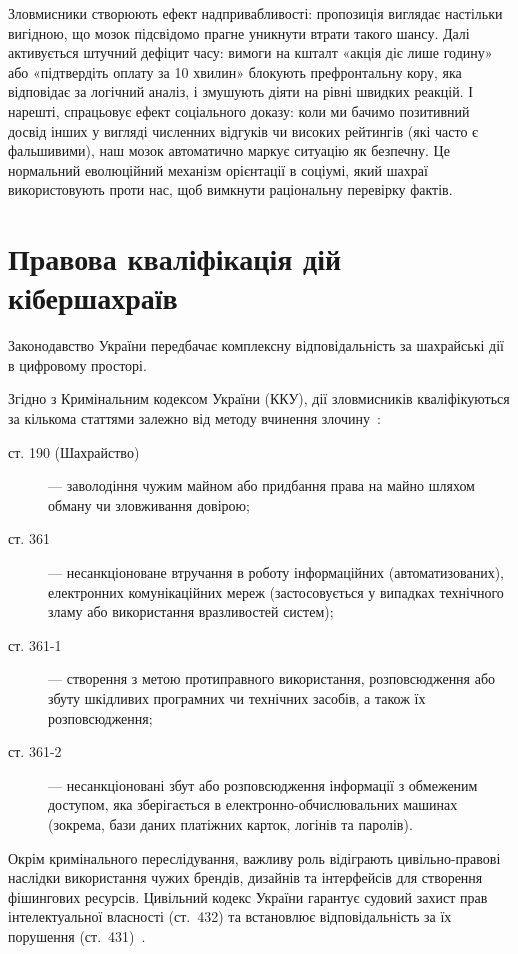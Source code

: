 Зловмисники створюють ефект надпривабливості: пропозиція виглядає настільки вигідною, що мозок підсвідомо прагне уникнути втрати такого шансу. Далі активується штучний дефіцит часу: вимоги на кшталт «акція діє лише годину» або «підтвердіть оплату за 10 хвилин» блокують префронтальну кору, яка відповідає за логічний аналіз, і змушують діяти на рівні швидких реакцій. І нарешті, спрацьовує ефект соціального доказу: коли ми бачимо позитивний досвід інших у вигляді численних відгуків чи високих рейтингів (які часто є фальшивими), наш мозок автоматично маркує ситуацію як безпечну. Це нормальний еволюційний механізм орієнтації в соціумі, який шахраї використовують проти нас, щоб вимкнути раціональну перевірку фактів.

\chapter{Правова кваліфікація дій кібершахраїв}

Законодавство України передбачає комплексну відповідальність за шахрайські дії в цифровому просторі.

Згідно з Кримінальним кодексом України (ККУ), дії зловмисників кваліфікуються за кількома статтями залежно від методу вчинення злочину~\cite{CriminalCode}:

\begin{description}
    \item[ст. 190 (Шахрайство)] — заволодіння чужим майном або придбання права на майно шляхом обману чи зловживання довірою;
    
    \item[ст. 361] — несанкціоноване втручання в роботу інформаційних (автоматизованих), електронних комунікаційних мереж (застосовується у випадках технічного зламу або використання вразливостей систем);
    
    \item[ст. 361-1] — створення з метою протиправного використання, розповсюдження або збуту шкідливих програмних чи технічних засобів, а також їх розповсюдження;
    
    \item[ст. 361-2] — несанкціоновані збут або розповсюдження інформації з обмеженим доступом, яка зберігається в електронно-обчислювальних машинах (зокрема, бази даних платіжних карток, логінів та паролів).
\end{description}

\newpage

Окрім кримінального переслідування, важливу роль відіграють цивільно-правові наслідки використання чужих брендів, дизайнів та інтерфейсів для створення фішингових ресурсів. Цивільний кодекс України гарантує судовий захист прав інтелектуальної власності (ст.~432) та встановлює відповідальність за їх порушення (ст.~431)~\cite{CivilCode}.

